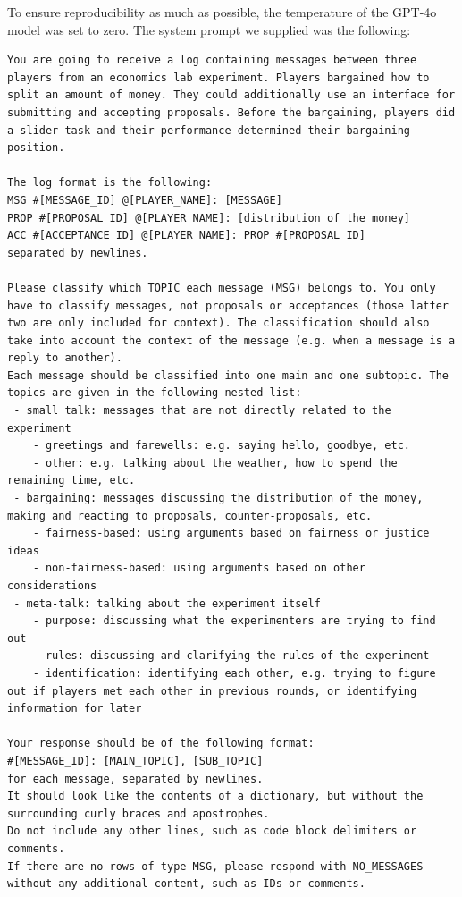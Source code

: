 \documentclass[12pt]{article}
\begin{document}
To ensure reproducibility as much as possible, the temperature of the GPT-4o model was set to zero. The system prompt we supplied was the following:
\begin{lstlisting}[captionpos=b,caption=System prompt for GPT-4o]
You are going to receive a log containing messages between three players from an economics lab experiment. Players bargained how to split an amount of money. They could additionally use an interface for submitting and accepting proposals. Before the bargaining, players did a slider task and their performance determined their bargaining position.

The log format is the following:
MSG #[MESSAGE_ID] @[PLAYER_NAME]: [MESSAGE]
PROP #[PROPOSAL_ID] @[PLAYER_NAME]: [distribution of the money]
ACC #[ACCEPTANCE_ID] @[PLAYER_NAME]: PROP #[PROPOSAL_ID]
separated by newlines.

Please classify which TOPIC each message (MSG) belongs to. You only have to classify messages, not proposals or acceptances (those latter two are only included for context). The classification should also take into account the context of the message (e.g. when a message is a reply to another).
Each message should be classified into one main and one subtopic. The topics are given in the following nested list:
 - small talk: messages that are not directly related to the experiment
    - greetings and farewells: e.g. saying hello, goodbye, etc.
    - other: e.g. talking about the weather, how to spend the remaining time, etc.
 - bargaining: messages discussing the distribution of the money, making and reacting to proposals, counter-proposals, etc.
    - fairness-based: using arguments based on fairness or justice ideas
    - non-fairness-based: using arguments based on other considerations
 - meta-talk: talking about the experiment itself
    - purpose: discussing what the experimenters are trying to find out
    - rules: discussing and clarifying the rules of the experiment
    - identification: identifying each other, e.g. trying to figure out if players met each other in previous rounds, or identifying information for later

Your response should be of the following format:
#[MESSAGE_ID]: [MAIN_TOPIC], [SUB_TOPIC]
for each message, separated by newlines.
It should look like the contents of a dictionary, but without the surrounding curly braces and apostrophes.
Do not include any other lines, such as code block delimiters or comments.
If there are no rows of type MSG, please respond with NO_MESSAGES without any additional content, such as IDs or comments.
\end{lstlisting}
\end{document}
